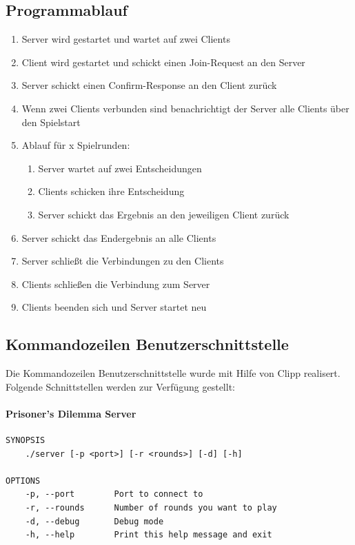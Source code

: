 \documentclass[12pt, letterpaper]{article}
\begin{document}
\subsection{Programmablauf}
\begin{enumerate}
	\item Server wird gestartet und wartet auf zwei Clients
	\item Client wird gestartet und schickt einen Join-Request an den Server
	\item Server schickt einen Confirm-Response an den Client zurück
	\item Wenn zwei Clients verbunden sind benachrichtigt der Server alle Clients über den Spielstart
	\item Ablauf für x Spielrunden:
	\begin{enumerate}
		\item Server wartet auf zwei Entscheidungen
		\item Clients schicken ihre Entscheidung
		\item Server schickt das Ergebnis an den jeweiligen Client zurück
	\end{enumerate}
	\item Server schickt das Endergebnis an alle Clients
	\item Server schließt die Verbindungen zu den Clients
	\item Clients schließen die Verbindung zum Server
	\item Clients beenden sich und Server startet neu
\end{enumerate}

\newpage

\subsection{Kommandozeilen Benutzerschnittstelle}
Die Kommandozeilen Benutzerschnittstelle wurde mit Hilfe von Clipp realisert. Folgende Schnittstellen werden zur Verfügung gestellt:

\paragraph{Prisoner's Dilemma Server}
\begin{Verbatim}[fontsize=\small]
SYNOPSIS
    ./server [-p <port>] [-r <rounds>] [-d] [-h]

OPTIONS
    -p, --port        Port to connect to
    -r, --rounds      Number of rounds you want to play
    -d, --debug       Debug mode
    -h, --help        Print this help message and exit
\end{Verbatim}
\end{document}
